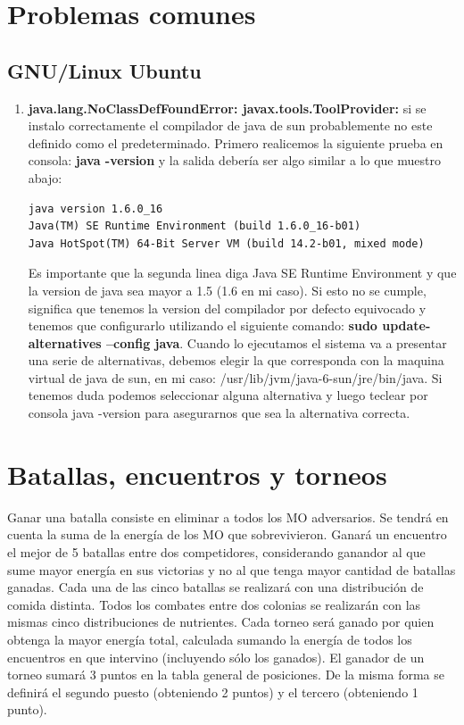 \documentclass[11pt,a4paper]{article}
\begin{document}
\section{Problemas comunes}
	\subsection{GNU/Linux Ubuntu}
	\begin{enumerate}
		\item {\bf java.lang.NoClassDefFoundError: javax.tools.ToolProvider:}
		si se instalo correctamente el compilador de java 
		de sun probablemente no este definido como el predeterminado. Primero realicemos la siguiente prueba en consola: {\bf java -version}
		y la salida debería ser algo similar a lo que muestro abajo: 
\begin{lstlisting}[style=Code]
java version 1.6.0_16 
Java(TM) SE Runtime Environment (build 1.6.0_16-b01)
Java HotSpot(TM) 64-Bit Server VM (build 14.2-b01, mixed mode)
\end{lstlisting}
		Es importante que la segunda linea diga Java SE Runtime Environment y que la version de java sea mayor a 1.5 (1.6 en mi caso). 
		Si esto no se cumple, significa que tenemos la version del compilador por defecto equivocado y tenemos que configurarlo 
		utilizando el siguiente comando: {\bf sudo update-alternatives --config java}. Cuando lo ejecutamos el sistema va a presentar una serie 
		de alternativas, debemos elegir la que corresponda con la maquina virtual de java de sun,  en mi caso: /usr/lib/jvm/java-6-sun/jre/bin/java.
		Si tenemos duda podemos seleccionar alguna alternativa y luego teclear por consola java -version para asegurarnos que sea la alternativa correcta.
	\end{enumerate}
	
\section{Batallas, encuentros y torneos }
Ganar una batalla consiste en eliminar a todos los MO adversarios. Se tendrá en cuenta la suma de la energía de los MO que sobrevivieron.
Ganará un encuentro el mejor de 5 batallas entre dos competidores, considerando ganandor al que sume mayor energía en sus victorias y no al que tenga mayor cantidad de batallas ganadas. Cada una de las cinco batallas se realizará con una distribución de comida distinta. Todos los combates entre dos colonias se realizarán con las mismas cinco distribuciones de nutrientes.
Cada torneo será ganado por quien obtenga la mayor energía total, calculada sumando la energía de todos los encuentros en que intervino (incluyendo sólo los ganados). El ganador de un torneo sumará 3 puntos en la tabla general de posiciones. De la misma forma se definirá el segundo puesto (obteniendo 2 puntos) y el tercero (obteniendo 1 punto).
\end{document}
